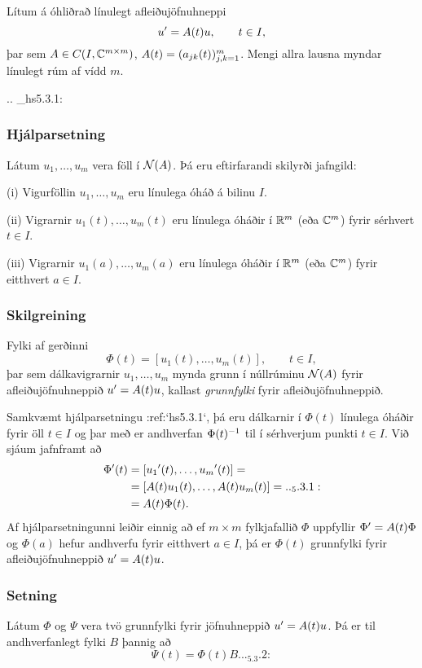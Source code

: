 \noindent
Lítum á óhliðrað línulegt afleiðujöfnuhneppi 
 $$u{\sp{\prime}}=A(t)u, \qquad t\in I,
 $$
þar sem  $A\in C(I,{\mathbb C}\sp{m\times m})$, 
$A(t)=(a_{jk}(t))_{j,k=1}\sp m$.
Mengi allra lausna myndar línulegt rúm af vídd $m$.





.. _hs5.3.1:

\subsubsection{Hjálparsetning} Látum $u_1,\dots,u_m$ vera föll í ${\cal N}(A)$.  Þá eru
eftirfarandi skilyrði jafngild:

\noindent
(i) Vigurföllin $u_1,\dots,u_m$ eru línulega óháð á bilinu $I$.

\noindent
(ii) Vigrarnir $u_1(t),\dots,u_m(t)$ eru línulega óháðir í ${\mathbb R}\sp m$
(eða ${\mathbb C}\sp m$) fyrir sérhvert $t\in I$.

\noindent
(iii) Vigrarnir $u_1(a),\dots,u_m(a)$ eru línulega óháðir í ${\mathbb R}\sp m$
(eða ${\mathbb C}\sp m$) fyrir eitthvert  $a\in I$.
 

\subsubsection{Skilgreining} Fylki af gerðinni
$$ \Phi(t)=[u_1(t),\dots,u_m(t)], \qquad t\in I, $$ 
þar sem dálkavigrarnir $u_1,\dots,u_m$ mynda grunn í núllrúminu ${\cal
N}(A)$ fyrir afleiðujöfnuhneppið $u{\sp{\prime}}=A(t)u$, kallast
{\it grunnfylki} fyrir afleiðujöfnuhneppið.


Samkvæmt hjálparsetningu :ref:`hs5.3.1`, þá eru dálkarnir í $\Phi(t)$
línulega óháðir fyrir öll $t\in I$ og þar með er andhverfan
$\Phi(t)\sp{-1}$ til í sérhverjum punkti $t\in I$.  Við sjáum
jafnframt að
\begin{align*}
\Phi\dash(t)&= [u_1\dash(t),\dots,u_m\dash(t)]=\nonumber\\
&=[A(t)u_1(t),\dots,A(t)u_m(t)]=

.. _5.3.1:
\\
&=A(t)\Phi(t).\nonumber
\end{align*}
Af hjálparsetningunni leiðir einnig að ef $m\times
m$ fylkjafallið $\Phi$ uppfyllir $\Phi{\sp{\prime}}=A(t)\Phi$ og $\Phi(a)$
hefur andhverfu fyrir eitthvert $a\in I$, þá er $\Phi(t)$ grunnfylki
fyrir afleiðujöfnuhneppið $u{\sp{\prime}} =A(t)u$.

\subsubsection{Setning}
Látum $\Phi$ og $\Psi$ vera tvö grunnfylki fyrir jöfnuhneppið
$u{\sp{\prime}}=A(t)u$. Þá er til andhverfanlegt fylki $B$ þannig að 
 \begin{equation*}\Psi(t)=\Phi(t)B.

.. _5.3.2:

 \end{equation*}



